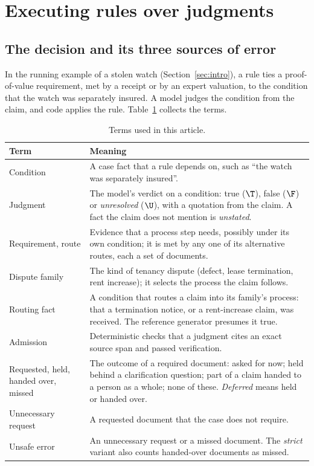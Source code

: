 \section{Executing rules over judgments}
\label{sec:method}

\subsection{The decision and its three sources of error}
\label{sec:problem}

In the running example of a stolen watch (Section~\ref{sec:intro}), a rule ties a proof-of-value requirement, met by a receipt or by an expert valuation, to the condition that the watch was separately insured. A model judges the condition from the claim, and code applies the rule. Table~\ref{tab:glossary} collects the terms.

\begin{table}[t]
\caption{Terms used in this article.}
\label{tab:glossary}
\small
\begin{tabularx}{\linewidth}{@{}lX@{}}
\toprule
Term & Meaning \\
\midrule
Condition & A case fact that a rule depends on, such as ``the watch was separately insured''. \\
Judgment & The model's verdict on a condition: true ($\T$), false ($\F$) or \emph{unresolved} ($\U$), with a quotation from the claim. A fact the claim does not mention is \emph{unstated}. \\
Requirement, route & Evidence that a process step needs, possibly under its own condition; it is met by any one of its alternative routes, each a set of documents. \\
Dispute family & The kind of tenancy dispute (defect, lease termination, rent increase); it selects the process the claim follows. \\
Routing fact & A condition that routes a claim into its family's process: that a termination notice, or a rent-increase claim, was received. The reference generator presumes it true. \\
Admission & Deterministic checks that a judgment cites an exact source span and passed verification. \\
Requested, held, handed over, missed & The outcome of a required document: asked for now; held behind a clarification question; part of a claim handed to a person as a whole; none of these. \emph{Deferred} means held or handed over. \\
Unnecessary request & A requested document that the case does not require. \\
Unsafe error & An unnecessary request or a missed document. The \emph{strict} variant also counts handed-over documents as missed. \\
\bottomrule
\end{tabularx}
\end{table}

